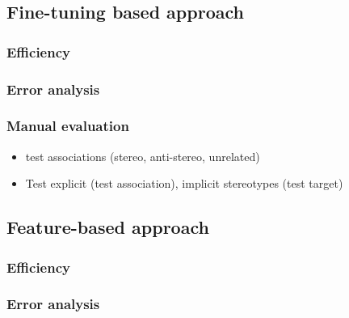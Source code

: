 \subsection{Fine-tuning based approach}

\subsubsection{Efficiency}
\subsubsection{Error analysis}
\subsubsection{Manual evaluation}
\begin{itemize}
    \item test associations (stereo, anti-stereo, unrelated)
    \item Test explicit (test association), implicit stereotypes (test target)
\end{itemize}
\subsection{Feature-based approach}

\subsubsection{Efficiency}
\subsubsection{Error analysis}
